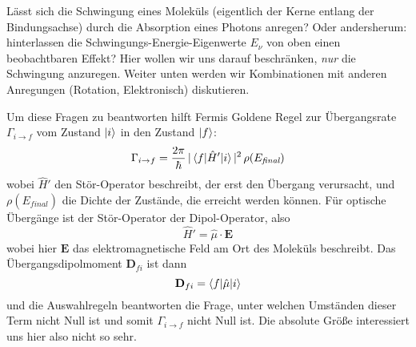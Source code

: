 Lässt sich die Schwingung eines Moleküls (eigentlich der Kerne entlang der Bindungsachse) durch die Absorption eines Photons anregen? Oder andersherum: hinterlassen die Schwingungs-Energie-Eigenwerte $E_\nu$ von oben einen beobachtbaren Effekt? Hier wollen wir uns darauf beschränken, \emph{nur} die Schwingung anzuregen. Weiter unten werden wir Kombinationen mit anderen Anregungen (Rotation, Elektronisch) diskutieren.

Um diese Fragen zu beantworten hilft Fermis Goldene Regel zur Übergangsrate $\Gamma_{i \rightarrow f}$ vom Zustand $\ket{i}$ in den Zustand $\ket{f}$:
\begin{equation}
\Gamma_{i \rightarrow f} = \frac{2 \pi}{\hbar} \, |\braket{f | \hat{H}' | i} |^2 \, \rho(E_\textit{final})
\end{equation}
wobei $\hat{H}'$ den Stör-Operator beschreibt, der erst den Übergang verursacht, und $ \rho(E_\textit{final})$ die Dichte der Zustände, die erreicht werden können. Für optische Übergänge ist der Stör-Operator der Dipol-Operator, also
\begin{equation}
\hat{H}' = \hat{\mu} \cdot \mathbf{E}
\end{equation}
wobei hier $\mathbf{E}$ das elektromagnetische Feld am Ort des Moleküls beschreibt. Das Übergangsdipolmoment $\mathbf{D}_{fi}$ ist dann 
\begin{equation}
 \mathbf{D}_{fi} = \braket{f | \hat{\mu} | i} 
\end{equation}
und die Auswahlregeln beantworten die Frage, unter welchen Umständen dieser Term nicht Null ist und somit $\Gamma_{i \rightarrow f} $ nicht Null ist. Die absolute Größe interessiert uns hier also nicht so sehr.

